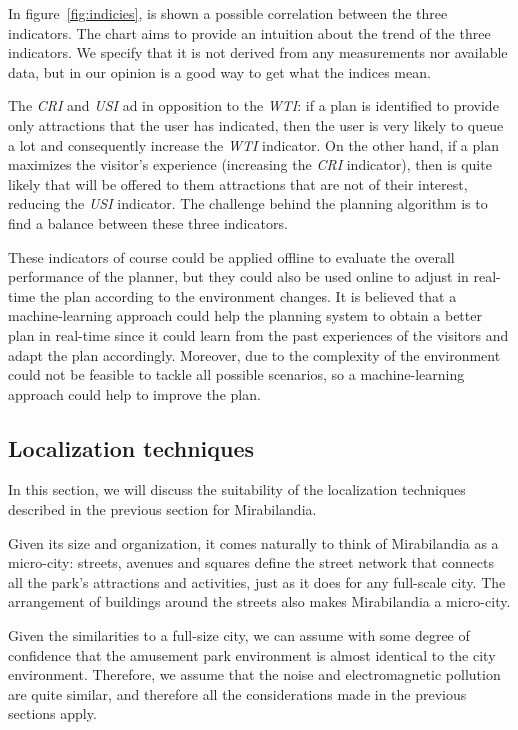 In figure~\ref{fig:indicies}, is shown a possible correlation between the three indicators. The chart aims to provide an intuition about the trend of
the three indicators. We specify that it is not derived from any measurements nor available data, but in our opinion is a good way to get what the
indices mean.

The \textit{CRI} and \textit{USI} ad in opposition to the \textit{WTI}: if a plan is identified to provide only attractions that the user has
indicated, then the user is very likely to queue a lot and consequently increase the \textit{WTI} indicator. On the other hand, if a plan maximizes
the visitor's experience (increasing the \textit{CRI} indicator), then is quite likely that will be offered to them attractions that are not of their
interest, reducing the \textit{USI} indicator. The challenge behind the planning algorithm is to find a balance between these three indicators.

These indicators of course could be applied offline to evaluate the overall performance of the planner, but they could also be used online to adjust
in real-time the plan according to the environment changes. It is believed that a machine-learning approach could help the planning system to obtain
a better plan in real-time since it could learn from the past experiences of the visitors and adapt the plan accordingly. Moreover, due to the
complexity of the environment could not be feasible to tackle all possible scenarios, so a machine-learning approach could help to improve the plan.

\subsection{Localization techniques}
In this section, we will discuss the suitability of the localization techniques described in the previous section for Mirabilandia.

Given its size and organization, it comes naturally to think of Mirabilandia as a micro-city: streets, avenues and squares define the street network
that connects all the park's attractions and activities, just as it does for any full-scale city. The arrangement of buildings around the streets
also makes Mirabilandia a micro-city.

Given the similarities to a full-size city, we can assume with some degree of confidence that the amusement park environment is almost identical to
the city environment. Therefore, we assume that the noise and electromagnetic pollution are quite similar, and therefore all the considerations made
in the previous sections apply.


